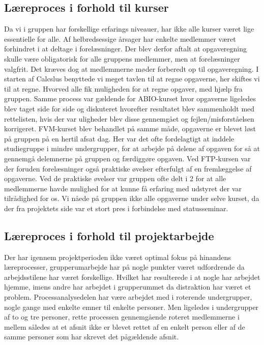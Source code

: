 \subsection{Læreproces i forhold til kurser}
Da vi i gruppen har forskellige erfarings niveauer, har ikke alle kurser været lige essentielle for alle. Af helbredsessige årsager har enkelte medlemmer været forhindret i at deltage i forelæsninger. Der blev derfor aftalt at opgaveregning skulle være obligatorisk for alle gruppens medlemmer, men at forelæsninger valgfrit. Det kræves dog at medlemmerne møder forberedt op til opgaveregning. I starten af Calcslus benyttede vi meget tavlen til at regne opgaverne, her skiftes vi til at regne. Hvorved alle fik muligheden for at regne opgaver, med hjælp fra gruppen. Samme process var gældende for ABIO-kurset hvor opgaverne ligeledes blev taget side for side og diskuteret hvorefter resultatet blev sammenholdt med rettelisten, hvis der var uligheder blev disse gennemgået og fejlen/misforståelsen korrigeret.
FVM-kurset blev behandlet på samme måde, opgaverne er blevet løst på gruppen på en hertil afsat dag. Her var det ofte fordelagtigt at inddele studiegruppe i mindre undergrupper, for at arbejde på delene af opgaven for så at gennemgå delemnerne på gruppen og færdiggøre opgaven. Ved FTP-kursen var der foruden forelæsninger også praktiske øvelser efterfulgt af en fremlæggelse af opgaverne. Ved de praktiske øvelser var gruppen ofte delt i 2 for at alle medlemmerne havde mulighed for at kunne få erfaring med udstyret der var tilrådighed for os. Vi nåede på gruppen ikke alle opgaverne under selve kurset, da der fra projektets side var et stort pres i forbindelse med statusseminar.  
\subsection{Læreproces i forhold til projektarbejde}
Der har igennem projektperioden ikke været optimal fokus på hinandens læreprocesser, grupperumarbejde har på nogle punkter været udfordrende da arbejdsstilene har været forskellige. Hvilket har resulterede i at nogle har arbejdet hjemme, imens andre har arbejdet i grupperummet da distraktion har været et problem. Processanalysedelen har være arbejdet med i roterende undergrupper, nogle gange med enkelte emner til enkelte personer. Men ligeledes i undergrupper af to og tre personer, rette processen gennemgående roteret medlemmerne i mellem således at et afsnit ikke er blevet rettet af en enkelt person eller af de samme personer som har skrevet det pågældende afsnit. 
